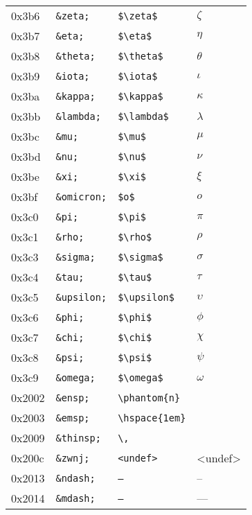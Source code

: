 \documentclass[a4paper,11pt]{article}
\begin{document}
{\begin{xtabular}{|l||l|l|l|}
0x3b6&\texttt{\&zeta;}&\texttt{\$\textbackslash zeta\$}&$\zeta$\\ 
0x3b7&\texttt{\&eta;}&\texttt{\$\textbackslash eta\$}&$\eta$\\ 
0x3b8&\texttt{\&theta;}&\texttt{\$\textbackslash theta\$}&$\theta$\\ 
0x3b9&\texttt{\&iota;}&\texttt{\$\textbackslash iota\$}&$\iota$\\ 
0x3ba&\texttt{\&kappa;}&\texttt{\$\textbackslash kappa\$}&$\kappa$\\ 
0x3bb&\texttt{\&lambda;}&\texttt{\$\textbackslash lambda\$}&$\lambda$\\ 
0x3bc&\texttt{\&mu;}&\texttt{\$\textbackslash mu\$}&$\mu$\\ 
0x3bd&\texttt{\&nu;}&\texttt{\$\textbackslash nu\$}&$\nu$\\ 
0x3be&\texttt{\&xi;}&\texttt{\$\textbackslash xi\$}&$\xi$\\ 
0x3bf&\texttt{\&omicron;}&\texttt{\$o\$}&$o$\\ 
0x3c0&\texttt{\&pi;}&\texttt{\$\textbackslash pi\$}&$\pi$\\ 
0x3c1&\texttt{\&rho;}&\texttt{\$\textbackslash rho\$}&$\rho$\\ 
0x3c3&\texttt{\&sigma;}&\texttt{\$\textbackslash sigma\$}&$\sigma$\\ 
0x3c4&\texttt{\&tau;}&\texttt{\$\textbackslash tau\$}&$\tau$\\ 
0x3c5&\texttt{\&upsilon;}&\texttt{\$\textbackslash upsilon\$}&$\upsilon$\\ 
0x3c6&\texttt{\&phi;}&\texttt{\$\textbackslash phi\$}&$\phi$\\ 
0x3c7&\texttt{\&chi;}&\texttt{\$\textbackslash chi\$}&$\chi$\\ 
0x3c8&\texttt{\&psi;}&\texttt{\$\textbackslash psi\$}&$\psi$\\ 
0x3c9&\texttt{\&omega;}&\texttt{\$\textbackslash omega\$}&$\omega$\\ 
0x2002&\texttt{\&ensp;}&\texttt{\textbackslash phantom\{n\}}&\phantom{n}\\ 
0x2003&\texttt{\&emsp;}&\texttt{\textbackslash hspace\{1em\}}&\hspace{1em}\\ 
0x2009&\texttt{\&thinsp;}&\texttt{\textbackslash,}&\,\\ 
0x200c&\texttt{\&zwnj;}&\texttt{<undef>}&<undef>\\ 
0x2013&\texttt{\&ndash;}&\texttt{--}&--\\ 
0x2014&\texttt{\&mdash;}&\texttt{---}&---\\ 

\end{xtabular}}
\end{document}
